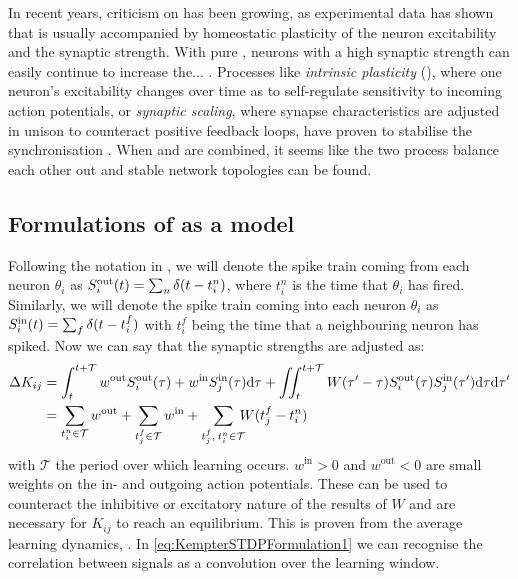 In recent years, criticism on \STDP has been growing, as experimental data has shown that \STDP is usually accompanied by homeostatic plasticity of the neuron excitability and the synaptic strength. With pure \STDP, neurons with a high synaptic strength can easily continue to increase the... . Processes like \textsl{intrinsic plasticity} (\IP), where one neuron's excitability changes over time as to self-regulate sensitivity to incoming action potentials, or \textsl{synaptic scaling}, where synapse characteristics are adjusted in unison to counteract positive feedback loops, have proven to stabilise the synchronisation \cite{ChrolCannon2014, Kirkwood2019}. When \STDP and \IP are combined, it seems like the two process balance each other out and stable network topologies can be found.


\subsection{Formulations of \STDP as a model}
Following the notation in \cite{Kempter1999}, we will denote the spike train coming from each neuron $\theta_i$ as $S_i^{\rm out}(t) = \sum_{n} \delta (t-t_{i}^{n})$, where $t_{i}^{n}$ is the time that $\theta_i$ has fired. Similarly, we will denote the spike train coming into each neuron $\theta_i$ as $S_i^{\rm in}(t) = \sum_{f} \delta (t-t_{i}^{f})$ with $t_{i}^{f}$ being the time that a neighbouring neuron has spiked. Now we can say that the synaptic strengths are adjusted as:
\begin{align}
\Delta K_{ij} &= \int_{t}^{t+\mathcal{T}} w^{\rm{out}} S_i^{\rm out}(\tau) + w^{\rm{in}} S_{j}^{\rm {in}}(\tau) \mathrm{d}\tau
+ \iint_{t}^{t+\mathcal{T}} W( \tau^\prime - \tau) S_{i}^{\rm out}(\tau) S_{j}^{\rm in}( \tau^\prime) \mathrm{d} \tau \mathrm{d} \tau^\prime
\label{eq:KempterSTDPFormulation1} \\
&= \sum_{t_i^{n}\in \mathcal{T}} w^{\mathrm{out}} + \sum_{t_{j}^{f} \in \mathcal{T}} w^{\mathrm{in}} + \sum_{t_{j}^{f}, \: t_i^{n} \in \mathcal{T}} \hspace{-2mm} W (t_{j}^{f}-t_i^{n} ) \label{eq:KempterSTDPFormulation2}
\end{align}
with $\mathcal{T}$ the period over which learning occurs. $w^{\mathrm{in}} > 0$ and $w^{\mathrm{out}} < 0$ are small weights on the in- and outgoing action potentials. These can be used to counteract the inhibitive or excitatory nature of the results of $W$ and are necessary for $K_{ij}$ to reach an equilibrium. This is proven from the average learning dynamics, \cite{Kempter1999}. In \eqref{eq:KempterSTDPFormulation1} we can recognise the correlation between signals as a convolution over the learning window. \\

